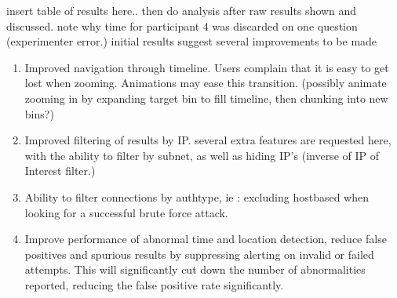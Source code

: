insert table of results here.. then do analysis after raw results shown and discussed.
note why time for participant 4 was discarded on one question (experimenter error.)
initial results suggest several improvements to be made
\begin{enumerate}
\item{Improved navigation through timeline. Users complain that it is easy to get lost when zooming. Animations may ease this transition. (possibly animate zooming in by expanding target bin to fill timeline, then chunking into new bins?)}
\item{Improved filtering of results by IP. several extra features are requested here, with the ability to filter by subnet, as well as hiding IP's (inverse of IP of Interest filter.)}
\item{Ability to filter connections by authtype, ie : excluding hostbased when looking for a successful brute force attack.}
\item{Improve performance of abnormal time and location detection, reduce false positives and spurious results by suppressing alerting on invalid or failed attempts. This will significantly cut down the number of abnormalities reported, reducing the false positive rate significantly.}
\end{enumerate}